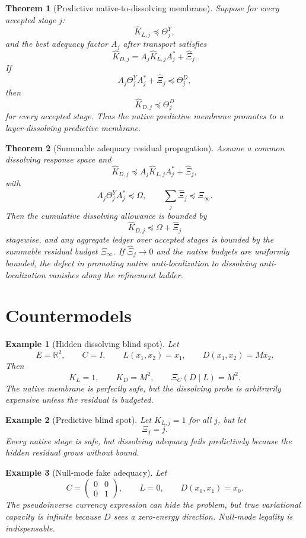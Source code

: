 \documentclass[11pt]{article}
\newtheorem{theorem}{Theorem}
\newtheorem{example}{Example}
\begin{document}
\begin{theorem}[Predictive native-to-dissolving membrane]
Suppose for every accepted stage $j$:
\[
\widehat K_{L,j}\preceq \Theta^Y_j,
\]
and the best adequacy factor $A_j$ after transport satisfies
\[
\widehat K_{D,j}=A_j\widehat K_{L,j}A_j^*+\widehat\Xi_j.
\]
If
\[
A_j\Theta^Y_jA_j^*+\widehat\Xi_j\preceq\Theta^D_j,
\]
then
\[
\boxed{
\widehat K_{D,j}\preceq\Theta^D_j
}
\]
for every accepted stage. Thus the native predictive membrane promotes to a layer-dissolving predictive membrane.
\end{theorem}

\begin{theorem}[Summable adequacy residual propagation]
Assume a common dissolving response space and
\[
\widehat K_{D,j}\preceq A_j\widehat K_{L,j}A_j^*+\widehat\Xi_j,
\]
with
\[
A_j\Theta^Y_jA_j^*\preceq \Omega,
\qquad
\sum_j \widehat\Xi_j\preceq \Xi_\infty.
\]
Then the cumulative dissolving allowance is bounded by
\[
\widehat K_{D,j}\preceq \Omega+\widehat\Xi_j
\]
stagewise, and any aggregate ledger over accepted stages is bounded by the summable residual budget $\Xi_\infty$.
If $\widehat\Xi_j\to0$ and the native budgets are uniformly bounded, the defect in promoting native anti-localization to dissolving anti-localization vanishes along the refinement ladder.
\end{theorem}

\section{Countermodels}
\begin{example}[Hidden dissolving blind spot]
Let
\[
E=\mathbb R^2,
\qquad C=I,
\qquad L(x_1,x_2)=x_1,
\qquad D(x_1,x_2)=M x_2.
\]
Then
\[
K_L=1,
\qquad K_D=M^2,
\qquad \Xi_C(D\mid L)=M^2.
\]
The native membrane is perfectly safe, but the dissolving probe is arbitrarily expensive unless the residual is budgeted.
\end{example}

\begin{example}[Predictive blind spot]
Let $K_{L,j}=1$ for all $j$, but let
\[
\Xi_j=j.
\]
Every native stage is safe, but dissolving adequacy fails predictively because the hidden residual grows without bound.
\end{example}

\begin{example}[Null-mode fake adequacy]
Let
\[
C=\begin{pmatrix}0&0\\0&1\end{pmatrix},
\qquad L=0,
\qquad D(x_0,x_1)=x_0.
\]
The pseudoinverse currency expression can hide the problem, but true variational capacity is infinite because $D$ sees a zero-energy direction.  Null-mode legality is indispensable.
\end{example}
\end{document}
